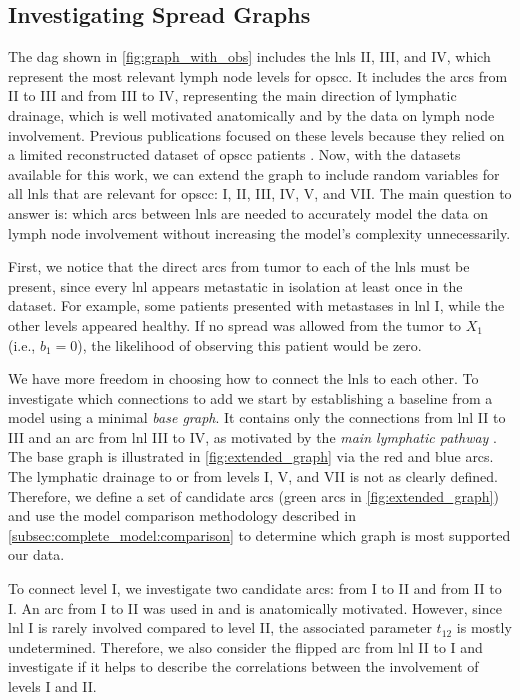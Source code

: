 \documentclass[twocolumn]{article}
\begin{document}
\subsection{Investigating Spread Graphs}
\label{subsec:complete_model:graphs}

The \gls{dag} shown in \cref{fig:graph_with_obs} includes the \glspl{lnl} II, III, and IV, which represent the most relevant lymph node levels for \gls{opscc}. It includes the arcs from II to III and from III to IV, representing the main direction of lymphatic drainage, which is well motivated anatomically and by the data on lymph node involvement. Previous publications  \cite{pouymayou_bayesian_2019,ludwig_hidden_2021} focused on these levels because they relied on a limited reconstructed dataset of \gls{opscc} patients \cite{sanguineti_defining_2009}. Now, with the datasets available for this work, we can extend the graph to include random variables for all \glspl{lnl} that are relevant for \gls{opscc}: I, II, III, IV, V, and VII. The main question to answer is: which arcs between \glspl{lnl} are needed to accurately model the data on lymph node involvement without increasing the model's complexity unnecessarily.

First, we notice that the direct arcs from tumor to each of the \glspl{lnl} must be present, since every \gls{lnl} appears metastatic in isolation at least once in the dataset. For example, some patients presented with metastases in \gls{lnl} I, while the other levels appeared healthy. If no spread was allowed from the tumor to $X_1$ (i.e., $b_1 = 0$), the likelihood of observing this patient would be zero.

We have more freedom in choosing how to connect the \glspl{lnl} to each other. To investigate which connections to add we start by establishing a baseline from a model using a minimal \emph{base graph}. It contains only the connections from \gls{lnl} II to III and an arc from \gls{lnl} III to IV, as motivated by the \emph{main lymphatic pathway} \cite{lengele_anatomical_2007}. The base graph is illustrated in \cref{fig:extended_graph} via the red and blue arcs. The lymphatic drainage to or from levels I, V, and VII is not as clearly defined. Therefore, we define a set of candidate arcs (green arcs in \cref{fig:extended_graph}) and use the model comparison methodology described in \cref{subsec:complete_model:comparison} to determine which graph is most supported our data. 

To connect level I, we investigate two candidate arcs: from I to II and from II to I. An arc from I to II was used in \cite{pouymayou_bayesian_2019,ludwig_hidden_2021} and is anatomically motivated. However, since \gls{lnl} I is rarely involved compared to level II, the associated parameter $t_{12}$ is mostly undetermined. Therefore, we also consider the flipped arc from \gls{lnl} II to I and investigate if it helps to describe the correlations between the involvement of levels I and II.
\end{document}
